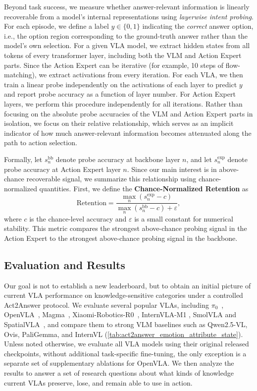 \documentclass[11pt]{article}
\begin{document}
Beyond task success, we measure whether answer-relevant information is linearly recoverable from a model's internal representations using \emph{layerwise intent probing}.
For each episode, we define a label $y \in \{0,1\}$ indicating the \emph{correct} answer option, i.e., the option region corresponding to the ground-truth answer rather than the model's own selection.
For a given VLA model, we extract hidden states from all tokens of every transformer layer, including both the VLM and Action Expert parts. Since the Action Expert can be iterative (for example, 10 steps of flow-matching), we extract activations from every iteration. For each VLA, we then train a linear probe independently on the activations of each layer to predict $y$ and report probe accuracy as a function of layer number. For Action Expert layers, we perform this procedure independently for all iterations. Rather than focusing on the absolute probe accuracies of the VLM and Action Expert parts in isolation, we focus on their relative relationship, which serves as an implicit indicator of how much answer-relevant information becomes attenuated along the path to action selection.

Formally, let $s_n^{\mathrm{bb}}$ denote probe accuracy at backbone layer $n$, and let $s_n^{\mathrm{exp}}$ denote probe accuracy at Action Expert layer $n$. Since our main interest is in above-chance recoverable signal, we summarize this relationship using chance-normalized quantities. First, we define the \textbf{Chance-Normalized Retention} as
\[
\mathrm{Retention}
=
\frac{\max_n (s_n^{\mathrm{exp}}-c)}{\max_n (s_n^{\mathrm{bb}}-c)+\varepsilon},
\]
where $c$ is the chance-level accuracy and $\varepsilon$ is a small constant for numerical stability. This metric compares the strongest above-chance probing signal in the Action Expert to the strongest above-chance probing signal in the backbone.

\subsection{Evaluation and Results}

Our goal is not to establish a new leaderboard, but to obtain an initial picture of current VLA performance on knowledge-sensitive categories under a controlled Act2Answer protocol. We evaluate several popular VLAs, including $\pi_0$~\citep{pi0}, OpenVLA~\citep{openvla}, Magma~\citep{magma}, Xiaomi-Robotics-R0~\citep{xiaomirobotics}, InternVLA-M1 \citep{chen2025internvla}, SmolVLA \citep{smolvla} and SpatialVLA~\citep{spatialvla}, and compare them to strong VLM baselines such as Qwen2.5-VL, Ovis, PaliGemma, and InternVL (\autoref{tab:act2answer_emotion_attribute_state}). Unless noted otherwise, we evaluate all VLA models using their original released checkpoints, without additional task-specific fine-tuning, the only exception is a separate set of supplementary ablations for OpenVLA. We then analyze the results to answer a set of research questions about what kinds of knowledge current VLAs preserve, lose, and remain able to use in action.
\end{document}
